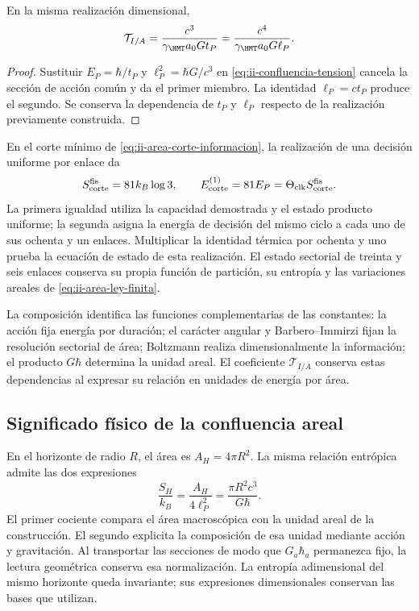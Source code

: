 \begin{proposition}
\label{prop:ii-confluencia-tension}
En la misma realización dimensional,
\begin{equation}
 \mathcal T_{I/A}
 =\frac{c^3}{\gamma_{\HMT}a_0G t_P}
 =\frac{c^4}{\gamma_{\HMT}a_0G\ell_P}.
 \label{eq:ii-confluencia-tension-gravedad}
\end{equation}
\end{proposition}
\begin{proof}
Sustituir \(E_P=\hbar/t_P\) y \(\ell_P^2=\hbar G/c^3\)
en \eqref{eq:ii-confluencia-tension} cancela la sección de acción
común y da el primer miembro. La identidad \(\ell_P=ct_P\)
produce el segundo. Se conserva la dependencia de \(t_P\) y
\(\ell_P\) respecto de la realización previamente construida.
\end{proof}

En el corte mínimo de \eqref{eq:ii-area-corte-informacion}, la
realización de una decisión uniforme por enlace da
\begin{equation}
 S_{\rm corte}^{\rm fis}=81k_B\log3,
 \qquad
 E_{\rm corte}^{(1)}=81E_P
 =\Theta_{\rm clk}S_{\rm corte}^{\rm fis}.
 \label{eq:ii-confluencia-corte-energia}
\end{equation}
La primera igualdad utiliza la capacidad demostrada y el estado producto
uniforme; la segunda asigna la energía de decisión del mismo ciclo a
cada uno de sus ochenta y un enlaces. Multiplicar la identidad térmica
por ochenta y uno prueba la ecuación de estado de esta realización.
El estado sectorial de treinta y seis enlaces conserva su propia
función de partición, su entropía y las variaciones areales de
\eqref{eq:ii-area-ley-finita}.

La composición identifica las funciones complementarias de las
constantes: la acción fija energía por duración; el carácter angular
y Barbero--Immirzi fijan la resolución sectorial de área; Boltzmann
realiza dimensionalmente la información; el producto \(G\hbar\)
determina la unidad areal. El coeficiente \(\mathcal T_{I/A}\)
conserva estas dependencias al expresar su relación en unidades de
energía por área.

\subsection{Significado físico de la confluencia areal}

En el horizonte de radio \(R\), el área es \(A_H=4\pi R^2\).
La misma relación entrópica admite las dos expresiones
\[
 \frac{S_H}{k_B}=\frac{A_H}{4\ell_P^2}
 =\frac{\pi R^2c^3}{G\hbar}.
\]
El primer cociente compara el área macroscópica con la unidad areal
de la construcción. El segundo explicita la composición de esa unidad
mediante acción y gravitación. Al transportar las secciones de modo
que \(G_a\hbar_a\) permanezca fijo, la lectura geométrica conserva
esa normalización. La entropía adimensional del mismo horizonte queda
invariante; sus expresiones dimensionales conservan las bases que
utilizan.

